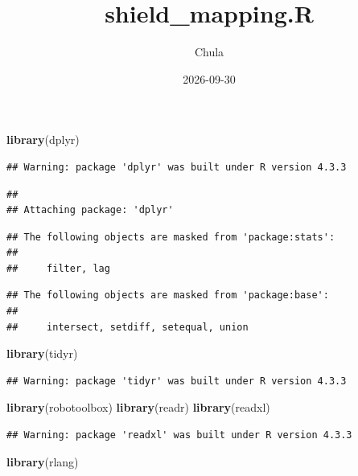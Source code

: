 \documentclass[
]{article}
\title{shield\_mapping.R}
\author{Chula}
\date{2026-09-30}
\newenvironment{Shaded}{\begin{snugshade}}{\end{snugshade}}
\newcommand{\FunctionTok}[1]{\textcolor[rgb]{0.13,0.29,0.53}{\textbf{#1}}}
\newcommand{\NormalTok}[1]{#1}
\begin{document}
\maketitle

\begin{Shaded}
\begin{Highlighting}[]
\FunctionTok{library}\NormalTok{(dplyr)}
\end{Highlighting}
\end{Shaded}

\begin{verbatim}
## Warning: package 'dplyr' was built under R version 4.3.3
\end{verbatim}

\begin{verbatim}
## 
## Attaching package: 'dplyr'
\end{verbatim}

\begin{verbatim}
## The following objects are masked from 'package:stats':
## 
##     filter, lag
\end{verbatim}

\begin{verbatim}
## The following objects are masked from 'package:base':
## 
##     intersect, setdiff, setequal, union
\end{verbatim}

\begin{Shaded}
\begin{Highlighting}[]
\FunctionTok{library}\NormalTok{(tidyr)}
\end{Highlighting}
\end{Shaded}

\begin{verbatim}
## Warning: package 'tidyr' was built under R version 4.3.3
\end{verbatim}

\begin{Shaded}
\begin{Highlighting}[]
\FunctionTok{library}\NormalTok{(robotoolbox)}
\FunctionTok{library}\NormalTok{(readr)}
\FunctionTok{library}\NormalTok{(readxl)}
\end{Highlighting}
\end{Shaded}

\begin{verbatim}
## Warning: package 'readxl' was built under R version 4.3.3
\end{verbatim}

\begin{Shaded}
\begin{Highlighting}[]
\FunctionTok{library}\NormalTok{(rlang)}
\end{Highlighting}
\end{Shaded}
\end{document}
